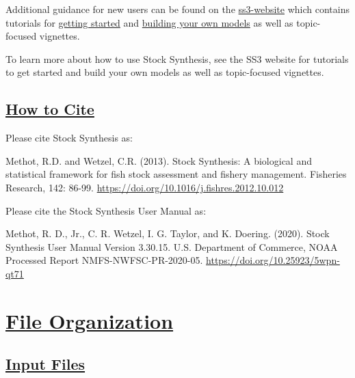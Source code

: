 Additional guidance for new users can be found on the \href{https://nmfs-ost.github.io/ss3-website/}{ss3-website} which contains tutorials for \href{https://nmfs-ost.github.io/ss3-website/qmds/getting_started_ss3.html}{getting started} and \href{https://github.com/nmfs-ost/ss3-source-code#how-can-i-learn-how-to-use-stock-synthesis}{building your own models} as well as topic-focused vignettes. 
 
To learn more about how to use Stock Synthesis, see the SS3 website for tutorials to get started and build your own models as well as topic-focused vignettes.

\hypertarget{HowToCite}{}
\subsection[How to Cite]{\protect\hyperlink{HowToCite}{How to Cite}}
Please cite Stock Synthesis as:

Methot, R.D. and Wetzel, C.R. (2013). Stock Synthesis: A biological and statistical
framework for fish stock assessment and fishery management. Fisheries Research, 
142: 86-99. \href{https://doi.org/10.1016/j.fishres.2012.10.012}{https://doi.org/10.1016/j.fishres.2012.10.012}

Please cite the Stock Synthesis User Manual as:

Methot, R. D., Jr., C. R. Wetzel, I. G. Taylor, and K. Doering. (2020). Stock Synthesis User Manual Version 3.30.15. U.S. Department of Commerce, NOAA Processed Report NMFS-NWFSC-PR-2020-05. \href{https://doi.org/10.25923/5wpn-qt71}{https://doi.org/10.25923/5wpn-qt71}

\pagebreak
		
\section[File Organization]{\protect\hyperref[FileOrganization]{File Organization}}\label{FileOrganization}
\hypertarget{InputFiles}{}
\subsection[Input File]{\protect\hyperlink{InputFiles}{Input Files}}

